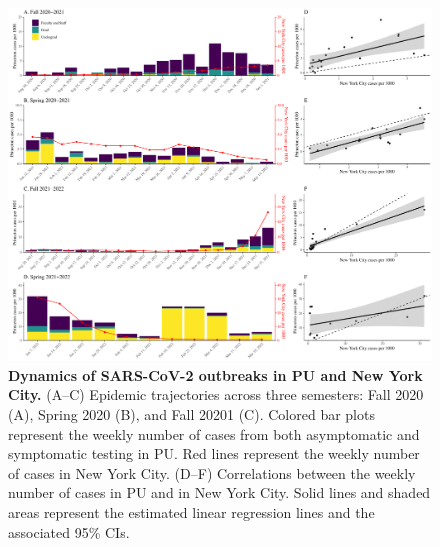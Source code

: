 \documentclass[12pt]{article}
\begin{document}
\begin{figure}[!htp]
\includegraphics[width=\textwidth]{../figure_princeton_new/figure_princeton_newyork_new.pdf}
\caption{
\textbf{Dynamics of SARS-CoV-2 outbreaks in PU and New York City.}
(A--C) Epidemic trajectories across three semesters: Fall 2020 (A), Spring 2020 (B), and Fall 20201 (C).
Colored bar plots represent the weekly number of cases from both asymptomatic and symptomatic testing in PU.
Red lines represent the weekly number of cases in New York City.
(D--F) Correlations between the weekly number of cases in PU and in New York City.
Solid lines and shaded areas represent the estimated linear regression lines and the associated 95\% CIs.
}
\end{figure}


\pagebreak
\end{document}
